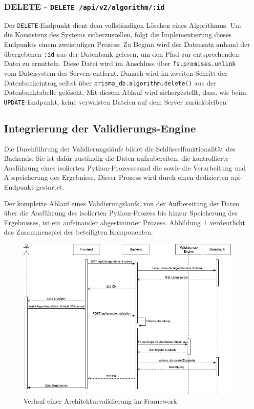 \subsubsection*{DELETE - \texttt{DELETE /api/v2/algorithm/:id}}

Der \texttt{DELETE}-Endpunkt dient dem vollständigen Löschen eines Algorithmus. Um die Konsistenz des Systems sicherzustellen, folgt die Implementierung dieses Endpunkts einem zweistufigen Prozess: Zu Beginn wird der Datensatz anhand der übergebenen \texttt{:id} aus der Datenbank gelesen, um den Pfad zur entsprechenden Datei zu ermitteln. Diese Datei wird im Anschluss über \texttt{fs.promises.unlink} vom Dateisystem des Servers entfernt. Danach wird im zweiten Schritt der Datenbankeintrag selbst über \texttt{prisma\_db.algorithm.delete()} aus der Datenbanktabelle gelöscht. Mit diesem Ablauf wird sichergestellt, dass, wie beim \texttt{UPDATE}-Endpunkt, keine verwaisten Dateien auf dem Server zurückbleiben

\subsection{Integrierung der Validierungs-Engine}
\label{subsec:engine}

Die Durchführung der Validierungsläufe bildet die Schlüsselfunktionalität des Backends. Sie ist dafür zuständig die Daten aufzubereiten, die kontrollierte Ausführung eines isolierten Python-Prozessesund die sowie die Verarbeitung und Abspeicherung der Ergebnisse. Dieser Prozess wird durch einen dedizierten \gls{api}-Endpunkt gestartet.

Der komplette Ablauf eines Validierungslaufs, von der Aufbereitung der Daten über die Ausführung des isolierten Python-Prozess bis hinzur Speicherung des Ergebnisses, ist ein aufeinander abgestimmter Prozess. Abbildung~\ref{fig:seqvalid} verdeutlicht das Zusammenspiel der beteiligten Komponenten.

\begin{figure}[h!]
  \centering
  \includegraphics[width=\textwidth]{figures/05Implementierung/Sequenz_valid.drawio.png}
  \caption{Verlauf einer Architekturvalidierung im Framework}
  \label{fig:seqvalid}
\end{figure}

